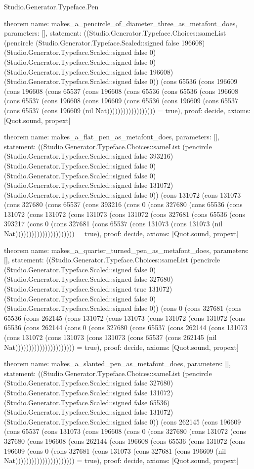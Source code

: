 \begin{lexlean}{Studio.Generator.Typeface.Pen}
\begin{semanticmodule}
theorem{
  name: makes_a_pencircle_of_diameter_three_as_metafont_does,
  parameters: [],
  statement: ((Studio.Generator.Typeface.Choices::sameList (pencircle (Studio.Generator.Typeface.Scaled::signed false 196608) (Studio.Generator.Typeface.Scaled::signed false 0) (Studio.Generator.Typeface.Scaled::signed false 0) (Studio.Generator.Typeface.Scaled::signed false 196608) (Studio.Generator.Typeface.Scaled::signed false 0)) (cons 65536 (cons 196609 (cons 196608 (cons 65537 (cons 196608 (cons 65536 (cons 65536 (cons 196608 (cons 65537 (cons 196608 (cons 196609 (cons 65536 (cons 196609 (cons 65537 (cons 65537 (cons 196609 (nil Nat)))))))))))))))))) = true),
  proof: decide{},
  axioms: [Quot.sound, propext]
}

theorem{
  name: makes_a_flat_pen_as_metafont_does,
  parameters: [],
  statement: ((Studio.Generator.Typeface.Choices::sameList (pencircle (Studio.Generator.Typeface.Scaled::signed false 393216) (Studio.Generator.Typeface.Scaled::signed false 0) (Studio.Generator.Typeface.Scaled::signed false 0) (Studio.Generator.Typeface.Scaled::signed false 131072) (Studio.Generator.Typeface.Scaled::signed false 0)) (cons 131072 (cons 131073 (cons 327680 (cons 65537 (cons 393216 (cons 0 (cons 327680 (cons 65536 (cons 131072 (cons 131072 (cons 131073 (cons 131072 (cons 327681 (cons 65536 (cons 393217 (cons 0 (cons 327681 (cons 65537 (cons 131073 (cons 131073 (nil Nat)))))))))))))))))))))) = true),
  proof: decide{},
  axioms: [Quot.sound, propext]
}

theorem{
  name: makes_a_quarter_turned_pen_as_metafont_does,
  parameters: [],
  statement: ((Studio.Generator.Typeface.Choices::sameList (pencircle (Studio.Generator.Typeface.Scaled::signed false 0) (Studio.Generator.Typeface.Scaled::signed false 327680) (Studio.Generator.Typeface.Scaled::signed true 131072) (Studio.Generator.Typeface.Scaled::signed false 0) (Studio.Generator.Typeface.Scaled::signed false 0)) (cons 0 (cons 327681 (cons 65536 (cons 262145 (cons 131072 (cons 131073 (cons 131072 (cons 131072 (cons 65536 (cons 262144 (cons 0 (cons 327680 (cons 65537 (cons 262144 (cons 131073 (cons 131072 (cons 131073 (cons 131073 (cons 65537 (cons 262145 (nil Nat)))))))))))))))))))))) = true),
  proof: decide{},
  axioms: [Quot.sound, propext]
}

theorem{
  name: makes_a_slanted_pen_as_metafont_does,
  parameters: [],
  statement: ((Studio.Generator.Typeface.Choices::sameList (pencircle (Studio.Generator.Typeface.Scaled::signed false 327680) (Studio.Generator.Typeface.Scaled::signed false 131072) (Studio.Generator.Typeface.Scaled::signed false 65536) (Studio.Generator.Typeface.Scaled::signed false 131072) (Studio.Generator.Typeface.Scaled::signed false 0)) (cons 262145 (cons 196609 (cons 65537 (cons 131073 (cons 196608 (cons 0 (cons 327680 (cons 131072 (cons 327680 (cons 196608 (cons 262144 (cons 196608 (cons 65536 (cons 131072 (cons 196609 (cons 0 (cons 327681 (cons 131073 (cons 327681 (cons 196609 (nil Nat)))))))))))))))))))))) = true),
  proof: decide{},
  axioms: [Quot.sound, propext]
}


\end{semanticmodule}
\end{lexlean}
